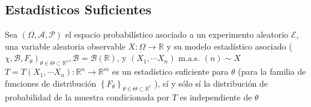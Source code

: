 \subsection*{Estadísticos Suficientes}

\begin{definición}
Sea $(\Omega, \mathcal{A}, \mathcal{P})$ el espacio probabilístico asociado a un experimento aleatorio $\mathcal{E}$, una variable aleatoria observable $X: \Omega \longrightarrow \mathbb{R}$ y su modelo estadístico asociado ( $\left.\chi, \mathcal{B}, F_{\theta}\right)_{\theta \in \Theta \subset \mathbb{R}^{\ell}}, \mathcal{B}=\mathcal{B}(\mathbb{R})$, y $\left(X_{1}, \cdots X_{n}\right)$ m.a.s. $(n) \sim X$\\
$T=T\left(X_{1}, \cdots X_{n}\right): \mathbb{R}^{n} \longrightarrow \mathbb{R}^{m}$ es un estadístico suficiente para $\theta$ (para la familia de funciones de distribución $\left\{F_{\theta}\right\}_{\theta \in \Theta \subset \mathbb{R}^{\ell}}$ ), sí y sólo sí la distribución de probabilidad de la muestra condicionada por $T$ es independiente de $\theta$
\end{definición}




